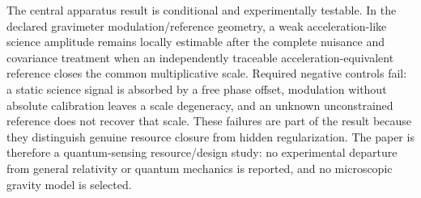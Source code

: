 The central apparatus result is conditional and experimentally testable. In the declared gravimeter modulation/reference geometry, a weak acceleration-like science amplitude remains locally estimable after the complete nuisance and covariance treatment when an independently traceable acceleration-equivalent reference closes the common multiplicative scale. Required negative controls fail: a static science signal is absorbed by a free phase offset, modulation without absolute calibration leaves a scale degeneracy, and an unknown unconstrained reference does not recover that scale. These failures are part of the result because they distinguish genuine resource closure from hidden regularization. The paper is therefore a quantum-sensing resource/design study: no experimental departure from general relativity or quantum mechanics is reported, and no microscopic gravity model is selected.
